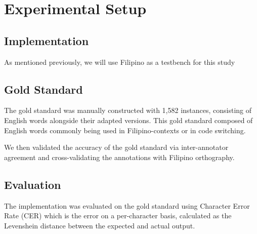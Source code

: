 \section{Experimental Setup}

\subsection{Implementation}

As mentioned previously, we will use Filipino as a testbench for
this study

\subsection{Gold Standard}
The gold standard was manually constructed with 1,582 instances, consisting of
English words alongside their adapted versions. This gold standard composed
of English words commonly being used in Filipino-contexts or in code
switching.
 
We then validated the accuracy of the gold standard via inter-annotator
agreement and cross-validating the annotations with Filipino orthography.

\subsection{Evaluation}

The implementation was evaluated on the gold standard using Character Error
Rate (CER) which is the error on a per-character basis, calculated
as the Levenshein distance between the expected and actual output.

